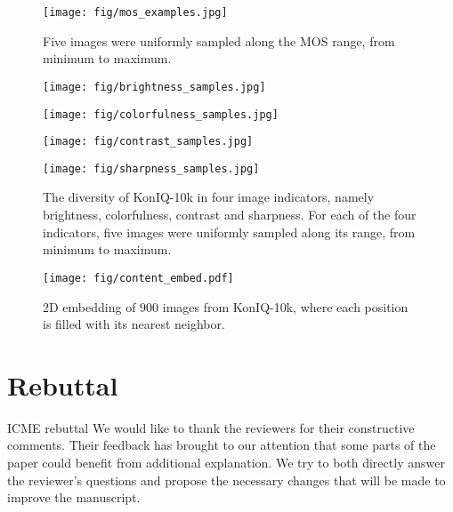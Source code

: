 \documentclass{article}
\begin{document}
\begin{figure*}[!htb]
\centering
\texttt{[image: fig/mos\_examples.jpg]}
\caption{Five images were uniformly sampled along the MOS range, from minimum to maximum. }
\label{fig:mos_examples}
\end{figure*}

\begin{figure*}[!htb]
\centering
\begin{minipage}{1.0\linewidth}
\texttt{[image: fig/brightness\_samples.jpg]}
\vspace{3pt}
\end{minipage}
\begin{minipage}{1.0\linewidth}
\texttt{[image: fig/colorfulness\_samples.jpg]}
\vspace{3pt}
\end{minipage}
\begin{minipage}{1.0\linewidth}
\texttt{[image: fig/contrast\_samples.jpg]}
\vspace{3pt}
\end{minipage}
\begin{minipage}{1.0\linewidth}
\texttt{[image: fig/sharpness\_samples.jpg]}
\vspace{3pt}
\end{minipage}
\caption{The diversity of KonIQ-10k in four image indicators, namely brightness, colorfulness, contrast and sharpness. For each of the four indicators, five images were uniformly sampled along its range, from minimum to maximum.}
\label{fig:indicator_samples}
\end{figure*}
\begin{figure*}[!ht]
\centering
\texttt{[image: fig/content\_embed.pdf]}
\caption{2D embedding of 900 images from KonIQ-10k, where each position is filled with its nearest neighbor.}
\label{fig:content_embed_img}
\end{figure*}





\section{Rebuttal}
ICME rebuttal
We would like to thank the reviewers for their constructive comments. Their feedback has brought to our attention that some parts of the paper could benefit from additional explanation. We try to both directly answer the reviewer’s questions and propose the necessary changes that will be made to improve the manuscript.
\end{document}
